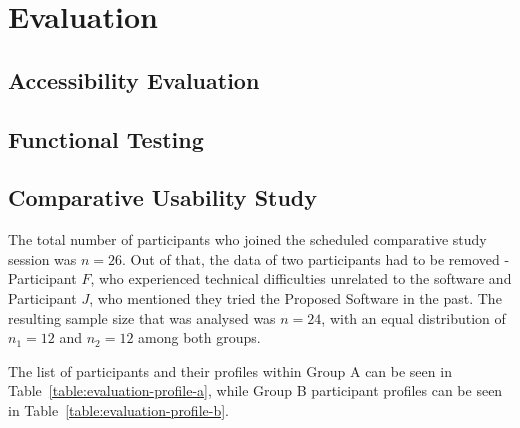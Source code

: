 \chapter{Evaluation}


\section{Accessibility Evaluation}
\label{Evaluation-Accessibility}


\section{Functional Testing}
\label{Evaluation-Tests}



\section{Comparative Usability Study}
\label{Evaluation-UX}

The total number of participants who joined the scheduled comparative study session was $n=26$.
Out of that, the data of two participants had to be removed - Participant $F$, who experienced technical difficulties unrelated to the software and Participant $J$, who mentioned they tried the Proposed Software in the past.
The resulting sample size that was analysed was $n=24$, with an equal distribution of $n_1=12$ and $n_2=12$ among both groups.

The list of participants and their profiles within Group A can be seen in Table~\ref{table:evaluation-profile-a}, while Group B participant profiles can be seen in Table~\ref{table:evaluation-profile-b}.

